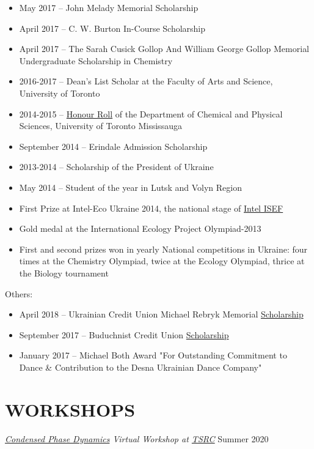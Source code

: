 \documentclass[9pt, margin]{res}
\begin{document}
\begin{resume}
\begin{itemize}
	\item May 2017 -- John Melady Memorial Scholarship %
	\item April 2017 -- C. W. Burton In-Course Scholarship %
	\item April 2017 -- The Sarah Cusick Gollop And William George Gollop Memorial Undergraduate Scholarship in Chemistry %
	\item 2016-2017 -- Dean’s List Scholar at the Faculty of Arts and Science, University of Toronto
	\item 2014-2015 --  \href{https://www.utm.utoronto.ca/cps/honour-roll/2014-15}{Honour Roll} of the Department of Chemical and Physical Sciences, University of Toronto Mississauga
	\item September 2014 -- Erindale Admission Scholarship %
	\item 2013-2014 -- Scholarship of the President of Ukraine %
	\item May 2014 -- Student of the year in Lutsk and Volyn Region %
	\item First Prize at Intel-Eco Ukraine 2014, the national stage of \href{https://student.societyforscience.org/intel-isef}{Intel ISEF}
	\item Gold medal at the International Ecology Project Olympiad-2013
	\item First and second prizes won in yearly National competitions in Ukraine: four times at the  Chemistry Olympiad, twice at the Ecology Olympiad, thrice at the Biology tournament
\end{itemize}
Others:
\begin{itemize}
	\item April 2018 -- Ukrainian Credit Union  Michael Rebryk Memorial  \href{http://ucu-building-community.blogspot.ca/2016/03/ucu-adds-new-scholarships-in-2016.html}{Scholarship}
	\item September 2017 -- Buduchnist Credit Union \href{http://www.buduchnist.com/scholarships}{Scholarship} %
	\item January 2017 -- Michael Both Award "For Outstanding Commitment to Dance \& Contribution to the Desna Ukrainian Dance Company" %
\end{itemize}


\section{WORKSHOPS}
{\sl \href{https://www.telluridescience.org/meetings/workshop-details?wid=829}{Condensed Phase Dynamics} Virtual Workshop at \href{https://www.telluridescience.org/schools/tellurideschoolontheoreticalchemistry}{TSRC}} \hfill Summer 2020


\end{resume}
\end{document}
